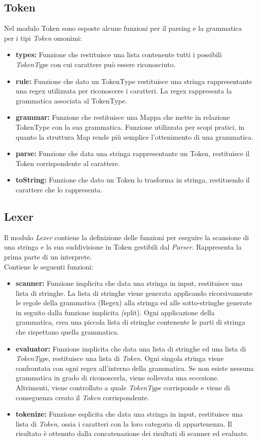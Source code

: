 \documentclass[\main/tesi.tex]{subfiles}
\begin{document}
\subsection{Token}
Nel modulo Token sono esposte alcune funzioni per il parsing e la grammatica per i tipi \textit{Token} omonimi:
\begin{itemize}
    \item \textbf{types:} Funzione che restituisce una lista contenente tutti i possibili \textit{TokenType} con cui carattere può essere riconosciuto.
    \item \textbf{rule:} Funzione che dato un TokenType restituisce una stringa rappresentante una regex utilizzata per riconoscere i caratteri. La regex rappresenta la grammatica associata al TokenType.
    \item \textbf{grammar:} Funzione che restituisce una Mappa che mette in relazione TokenType con la sua grammatica. Funzione utilizzata per scopi pratici, in quanto la struttura Map rende più semplice l'ottenimento di una grammatica.
    \item \textbf{parse:} Funzione che data una stringa rappresentante un Token, restituisce il Token corrispondente al carattere.
    \item \textbf{toString:} Funzione che dato un Token lo trasforma in stringa, restituendo il carattere che lo rappresenta.
\end{itemize}

\subsection{Lexer}
Il modulo \textit{Lexer} contiene la definizione delle funzioni per eseguire la scansione di una stringa e la sua suddivisione in Token gestibili dal \textit{Parser}. Rappresenta la prima parte di un interprete. \\
Contiene le seguenti funzioni:
\begin{itemize}
    \item \textbf{scanner:} Funzione implicita che data una stringa in input, restituisce una lista di stringhe. La lista di stringhe viene generata applicando ricorsivamente le regole della grammatica (Regex) alla stringa ed alle sotto-stringhe generate in seguito dalla funzione implicita \textit(split). Ogni applicazione della grammatica, crea una piccola lista di stringhe contenente le parti di stringa che rispettano quella grammatica.
    \item \textbf{evaluator:} Funzione implicita che data una lista di stringhe ed una lista di \textit{TokenType}, restituisce una lista di \textit{Token}. Ogni singola stringa viene confrontata con ogni regex all'interno della grammatica. Se non esiste nessuna grammatica in grado di riconoscerla, viene sollevata una eccezione. Altrimenti, viene controllato a quale \textit{TokenType} corrisponde e viene di conseguenza creato il \textit{Token} corrispondente.
    \item \textbf{tokenize:} Funzione esplicita che data una stringa in input, restituisce una lista di \textit{Token}, ossia i caratteri con la loro categoria di appartenenza. Il risultato è ottenuto dalla concatenazione dei risultati di scanner ed evaluate.
\end{itemize}
\end{document}
